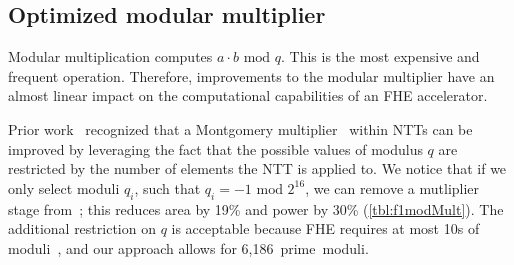 \subsection{Optimized modular multiplier}\label{sec:modMult}
\tblFOneModMult

Modular multiplication computes $a\cdot b \textrm{ mod } q$.
This is the most expensive and frequent operation.
Therefore, improvements to the modular multiplier have an almost
linear impact on the computational capabilities of an FHE accelerator.

Prior work~\cite{mert:euromicro19:design}
recognized that a Montgomery multiplier~\cite{montgomery:mom85:modular} within NTTs can be improved by leveraging
the fact that the possible values of modulus $q$ are restricted by the number of elements the NTT is applied to.
We notice that if we only select moduli $q_i$, such that $q_i = -1 \textrm{ mod } 2^{16}$,
we can remove a mutliplier stage from~\cite{mert:euromicro19:design};
this reduces area by 19\% and power by 30\% (\autoref{tbl:f1modMult}).
The additional restriction on $q$ is acceptable because FHE
requires at most 10s of moduli~\cite{gentry:crypto2012:homomorphic},
and our approach allows for 6,186~prime~moduli.
